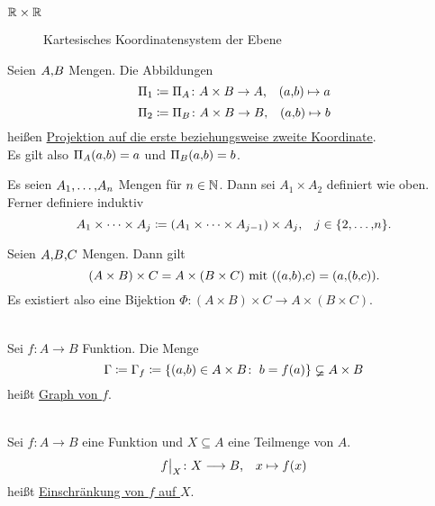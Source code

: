 \documentclass[../ana1.tex]{subfiles}
\begin{document}
\begin{bsp}\(\mathbb{R} \times \mathbb{R} \) \\
	\begin{figure}[h!]
		\centering
		\caption{Kartesisches Koordinatensystem der Ebene}
	\end{figure}
\end{bsp}

\begin{defi*}
	Seien \(A \text{,} B \) Mengen. Die Abbildungen
	\[\Pi_1 \coloneqq \Pi_A \colon A \times B \rightarrow A \text{,} \quad (a \text{,} b) \mapsto a \]
	\[\Pi_2 \coloneqq \Pi_B \colon A \times B \rightarrow B \text{,} \quad (a \text{,} b) \mapsto b \]
	heißen \underline{Projektion auf die erste beziehungsweise zweite Koordinate}. \\
	Es gilt also \(\Pi_A(a \text{,} b) = a \) und \(\Pi_B(a \text{,} b) = b\).
\end{defi*}

\begin{defi*}
	Es seien \(A_1 \text{,} \ldots \text{,} A_n \) Mengen für \(n \in \mathbb{N} \). Dann sei \(A_1 \times A_2 \) definiert wie oben.
	Ferner definiere induktiv
	\[A_1 \times \cdots \times A_j \coloneqq (A_1 \times \cdots \times A_{j-1}) \times A_j \text{,} \quad j \in \{2 \text{,} \ldots \text{,} n\}.\]
\end{defi*}

\begin{bem}
	Seien \(A \text{,} B \text{,} C\) Mengen. Dann gilt
	\[(A \times B) \times C = A \times (B \times C) \text{ mit } ((a \text{,} b) \text{,} c) = (a \text{,} (b \text{,} c)).\]
	Es existiert also eine Bijektion \(\Phi \colon (A \times B) \times C \longrightarrow A \times (B \times C)\).
\end{bem}

\begin{defi}\leavevmode \\
	Sei \(f \colon A \longrightarrow B \) Funktion. Die Menge
	\[\Gamma \coloneqq \Gamma_f \coloneqq \{(a \text{,} b) \in A \times B \colon \; b = f(a)\} \varsubsetneq A \times B \]
	heißt \underline{Graph von \(f\)}.
	\iftoggle{short}{}{
		\begin{figure}[h!]
			\centering
			\subfloat[Graph]{\subgraphic{0.3}{img05.pdf}}
			\qquad
			\subfloat[Kein Graph]{\subgraphic{0.3}{img06.pdf}}
		\end{figure}
	}
\end{defi}

\begin{notation}\leavevmode \\
	Sei \(f \colon A \longrightarrow B \) eine Funktion und \(X \subseteq A\) eine Teilmenge von \(A \).
	\[\restr{f}{X} \colon X \longrightarrow B \ko \quad x \mapsto f(x)\]
	heißt \underline{Einschränkung von \(f \) auf \(X \)}.
\end{notation}
\end{document}
